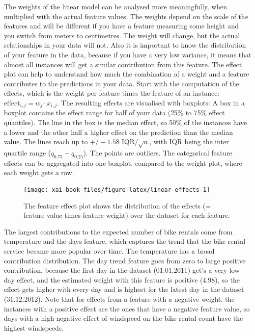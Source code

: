 \documentclass[12pt,]{krantz}
\theoremstyle{definition}
\theoremstyle{definition}
\theoremstyle{definition}
\theoremstyle{remark}
\begin{document}
The weights of the linear model can be analysed more meaningfully, when
multiplied with the actual feature values. The weights depend on the
scale of the features and will be different if you have a feature
measuring some height and you switch from meters to centimetres. The
weight will change, but the actual relationships in your data will not.
Also it is important to know the distribution of your feature in the
data, because if you have a very low variance, it means that almost all
instances will get a similar contribution from this feature. The effect
plot can help to understand how much the combination of a weight and a
feature contributes to the predictions in your data. Start with the
computation of the effects, which is the weight per feature times the
feature of an instance: \(\text{effect}_{i,j} = w_{j} \cdot x_{i,j}\).
The resulting effects are visualised with boxplots: A box in a boxplot
contains the effect range for half of your data (25\% to 75\% effect
quantiles). The line in the box is the median effect, so 50\% of the
instances have a lower and the other half a higher effect on the
prediction than the median value. The lines reach up to
\(+/- 1.58 \text{ IQR} / \sqrt{n}\), with IQR being the inter quartile
range (\(q_{0.75} - q_{0.25}\)). The points are outliers. The
categorical feature effects can be aggregated into one boxplot, compared
to the weight plot, where each weight gets a row.

\begin{figure}

{\centering \texttt{[image: xai-book\_files/figure-latex/linear-effects-1]} 

}

\caption{The feature effect plot shows the distribution of the effects (= feature value times feature weight) over the dataset for each feature.}\label{fig:linear-effects}
\end{figure}

The largest contributions to the expected number of bike rentals come
from temperature and the days feature, which captures the trend that the
bike rental service became more popular over time. The temperature has a
broad contribution distribution. The day trend feature goes from zero to
large positive contribution, because the first day in the dataset
(01.01.2011) get's a very low day effect, and the estimated weight with
this feature is positive (4.98), so the effect gets higher with every
day and is highest for the latest day in the dataset (31.12.2012). Note
that for effects from a feature with a negative weight, the instances
with a positive effect are the ones that have a negative feature value,
so days with a high negative effect of windspeed on the bike rental
count have the highest windspeeds.
\end{document}
